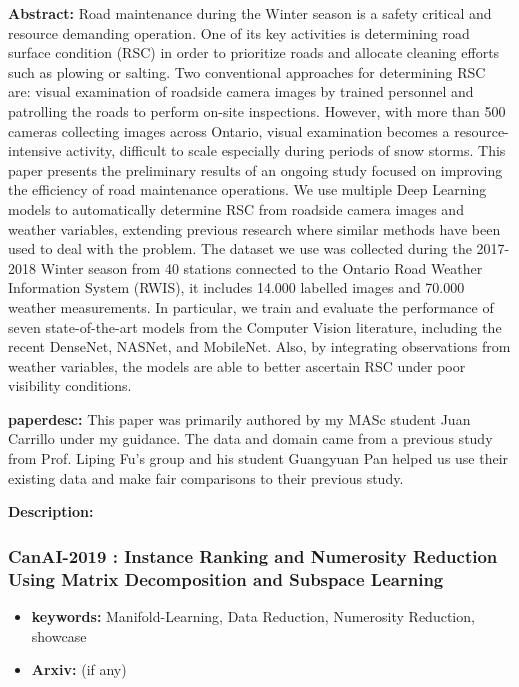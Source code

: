 \documentclass{article}
\begin{document}
\textbf{Abstract:} Road maintenance during the Winter season is a safety critical and resource demanding operation. One of its key activities is determining road surface condition (RSC) in order to prioritize roads and allocate cleaning efforts such as plowing or salting. Two conventional approaches for determining RSC are: visual examination of roadside camera images by trained personnel and patrolling the roads to perform on-site inspections. However, with more than 500 cameras collecting images across Ontario, visual examination becomes a resource-intensive activity, difficult to scale especially during periods of snow storms. This paper presents the preliminary results of an ongoing study focused on improving the efficiency of road maintenance operations. We use multiple Deep Learning models to automatically determine RSC from roadside camera images and weather variables, extending previous research where similar methods have been used to deal with the problem. The dataset we use was collected during the 2017-2018 Winter season from 40 stations connected to the Ontario Road Weather Information System (RWIS), it includes 14.000 labelled images and 70.000 weather measurements. In particular, we train and evaluate the performance of seven state-of-the-art models from the Computer Vision literature, including the recent DenseNet, NASNet, and MobileNet. Also, by integrating observations from weather variables, the models are able to better ascertain RSC under poor visibility conditions.

\textbf{paperdesc:} This paper was primarily authored by my MASc student Juan Carrillo under my guidance. The data and domain came from a previous study from Prof. Liping Fu's group and his student Guangyuan Pan helped us use their existing data and make fair comparisons to their previous study.

\textbf{Description:} 



\newpage
\subsubsection{\textbf{CanAI-2019} : Instance Ranking and Numerosity Reduction Using Matrix Decomposition and Subspace Learning}
\begin{itemize}
\item \textbf{keywords:} Manifold-Learning, Data Reduction, Numerosity Reduction, showcase
\item \textbf{Arxiv:}  (if any)
\end{itemize}
\end{document}
